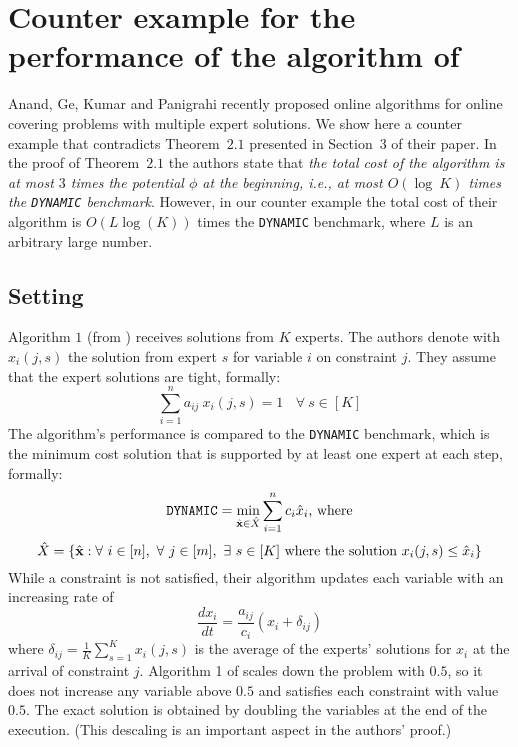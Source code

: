 
\section{Counter example for the performance of the algorithm of \cite{AnandGe22:Online-Algorithms}}
\label{sec:counter-example}


Anand, Ge, Kumar and Panigrahi \cite{AnandGe22:Online-Algorithms} recently proposed online algorithms for online covering problems with multiple expert solutions.
We show here a counter example that contradicts Theorem~$2.1$ presented in Section~$3$ of their paper.
In the proof of Theorem~$2.1$ the authors state that \textit{the total cost of the algorithm is at most $3$ times the potential $\phi$ at the beginning, i.e., at most $O(\log~K)$ times the \texttt{DYNAMIC} benchmark}. However, in our counter example the total cost of their algorithm is $O(L \log(K))$ times the \texttt{DYNAMIC} benchmark, where $L$ is an arbitrary large number.

\subsection{Setting}

Algorithm $1$ (from \cite{AnandGe22:Online-Algorithms}) receives solutions from $K$ experts. The authors denote with $x_i(j,s)$ the solution from expert $s$ for variable $i$ on constraint $j$. They assume that the expert solutions are tight, formally:
%
\[ \sum_{i=1}^{n} a_{ij}\ x_{i}(j, s) = 1 \ \ \ \ \forall\ s \in [K]\]
%
The algorithm's performance is compared to the \texttt{DYNAMIC} benchmark, which is the minimum cost solution that is supported by at least one expert at each step, formally:
%
\[\texttt{DYNAMIC} = \min_{\hat{\textbf{x}} \in \hat{X}} \sum_{i=1}^{n} c_i \hat{x}_i \textnormal{, where}\]
%
\[\hat{X} = \{\hat{\textbf{x}} : \forall\ i \in [n],\ \forall\ j \in [m],\ \exists\ s \in [K] \textnormal{ where the solution } x_i(j,s) \le \hat{x}_i \}\]
%
While a constraint is not satisfied, their algorithm updates each variable with an increasing rate of
%
\[\frac{dx_i}{dt} = \frac{a_{ij}}{c_i}(x_i + \delta_{ij})\]
%
where $\delta_{ij} = \frac{1}{K} \sum_{s=1}^{K} x_i(j,s)$ is the average of the experts' solutions for $x_i$ at the arrival of constraint $j$.
Algorithm 1 of \cite{AnandGe22:Online-Algorithms} scales down the problem with $0.5$, so it does not increase any variable above $0.5$ and satisfies each constraint with value $0.5$. The exact solution is obtained by doubling the variables at the end of the execution. (This descaling is an important aspect in the authors' proof.)

